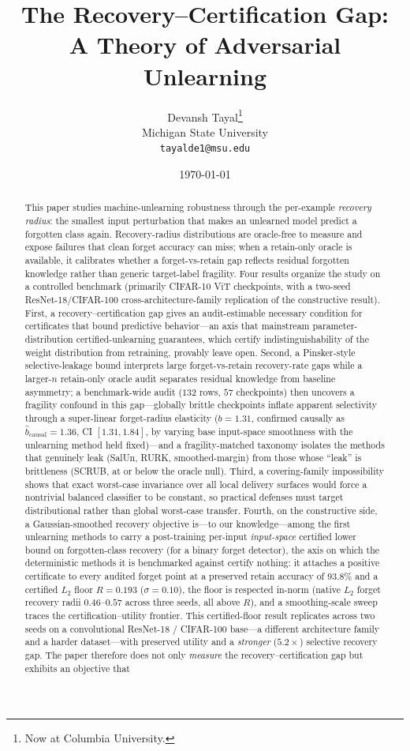\documentclass[11pt]{article}
\title{\textbf{The Recovery--Certification Gap:\\ A Theory of Adversarial Unlearning}}
\author{
  Devansh Tayal\thanks{Now at Columbia University.}\\
  \normalsize Michigan State University\\
  \normalsize \texttt{tayalde1@msu.edu}
}
\date{\today}
\begin{document}
\maketitle

\begin{abstract}
This paper studies machine-unlearning robustness through the per-example \emph{recovery radius}: the smallest input perturbation that makes an unlearned model predict a forgotten class again. Recovery-radius distributions are oracle-free to measure and expose failures that clean forget accuracy can miss; when a retain-only oracle is available, it calibrates whether a forget-vs-retain gap reflects residual forgotten knowledge rather than generic target-label fragility. Four results organize the study on a controlled benchmark (primarily CIFAR-10 ViT checkpoints, with a two-seed ResNet-18/CIFAR-100 cross-architecture-family replication of the constructive result). First, a recovery--certification gap gives an audit-estimable necessary condition for certificates that bound predictive behavior---an axis that mainstream parameter-distribution certified-unlearning guarantees, which certify indistinguishability of the weight distribution from retraining, provably leave open. Second, a Pinsker-style selective-leakage bound interprets large forget-vs-retain recovery-rate gaps while a larger-$n$ retain-only oracle audit separates residual knowledge from baseline asymmetry; a benchmark-wide audit ($132$ rows, $57$ checkpoints) then uncovers a fragility confound in this gap---globally brittle checkpoints inflate apparent selectivity through a super-linear forget-radius elasticity ($b{=}1.31$, confirmed causally as $\hat b_{\text{causal}}{=}1.36$, CI $[1.31,1.84]$, by varying base input-space smoothness with the unlearning method held fixed)---and a fragility-matched taxonomy isolates the methods that genuinely leak (SalUn, RURK, smoothed-margin) from those whose ``leak'' is brittleness (SCRUB, at or below the oracle null). Third, a covering-family impossibility shows that exact worst-case invariance over all local delivery surfaces would force a nontrivial balanced classifier to be constant, so practical defenses must target distributional rather than global worst-case transfer. Fourth, on the constructive side, a Gaussian-smoothed recovery objective is---to our knowledge---among the first unlearning methods to carry a post-training per-input \emph{input-space} certified lower bound on forgotten-class recovery (for a binary forget detector), the axis on which the deterministic methods it is benchmarked against certify nothing: it attaches a positive certificate to every audited forget point at a preserved retain accuracy of $93.8\%$ and a certified $L_2$ floor $R=0.193$ ($\sigma{=}0.10$), the floor is respected in-norm (native $L_2$ forget recovery radii $0.46$--$0.57$ across three seeds, all above $R$), and a smoothing-scale sweep traces the certification--utility frontier. This certified-floor result replicates across two seeds on a convolutional ResNet-18 / CIFAR-100 base---a different architecture family and a harder dataset---with preserved utility and a \emph{stronger} ($5.2\times$) selective recovery gap. The paper therefore does not only \emph{measure} the recovery--certification gap but exhibits an objective that 
\end{abstract}
\end{document}
